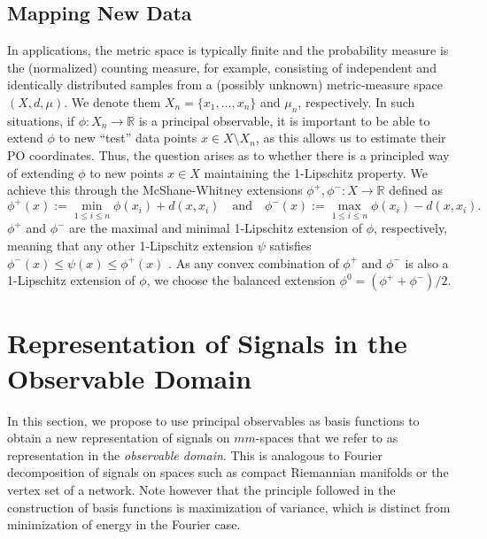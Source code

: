 \documentclass[11pt]{article}
\theoremstyle{definition}
\newcommand{\real}{\ensuremath{\mathbb{R}}}
\begin{document}

\subsection{Mapping New Data}

In applications, the metric space is typically finite and the probability measure is the (normalized) counting measure, for example, consisting of independent and identically distributed samples from a (possibly unknown) metric-measure space $(X,d,\mu)$. We denote them $X_n = \{x_1, \ldots, x_n\}$ and $\mu_n$, respectively. In such situations, if $\phi \colon X_n \to \real$ is a principal observable, it is important to be able to extend $\phi$ to new ``test'' data points $x \in X \setminus X_n$, as this allows us to estimate their PO coordinates. Thus, the question arises as to whether there is a principled way of extending $\phi$ to new points $x \in X$ maintaining the 1-Lipschitz property. We achieve this through the McShane-Whitney extensions $\phi^+, \phi^- \colon X \to \real$ defined as
\begin{equation} \label{E:wmextension}
\phi^+ (x) := \min_{1 \leq i \leq n} \phi(x_i) + d(x,x_i) \quad \text{and} \quad \phi^- (x) := \max_{1 \leq i \leq n} \phi(x_i) - d(x,x_i).
\end{equation}
$\phi^+$ and $\phi^-$ are the maximal and minimal 1-Lipschitz extension of $\phi$, respectively, meaning that any other 1-Lipschitz extension $\psi$ satisfies $\phi^- (x) \leq \psi(x) \leq \phi^+ (x)$ \cite{mcshane34,petrakis2018}. As any convex combination of $\phi^+$ and $\phi^-$ is also a 1-Lipschitz extension of $\phi$, we choose the balanced extension $\phi^0 = (\phi^+ + \phi^-)/2$.


\section{Representation of Signals in the Observable Domain} \label{S:basis}

In this section, we propose to use principal observables as basis functions to obtain a new representation of signals on $mm$-spaces that we refer to as representation in the {\em observable domain}. This is analogous to Fourier decomposition of signals on spaces such as compact Riemannian manifolds or the vertex set of a network. Note however that the principle followed in the construction of basis functions is maximization of variance, which is distinct from minimization of energy in the Fourier case. 
\end{document}
